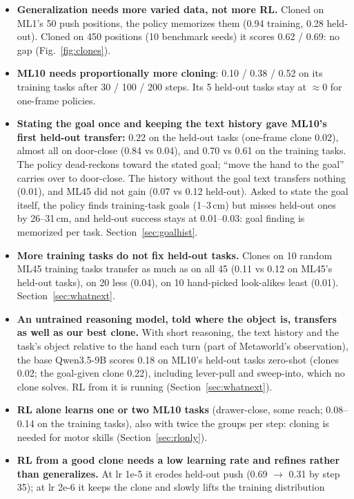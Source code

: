 \documentclass[11pt]{article}
\begin{document}
\begin{itemize}
\item \textbf{Generalization needs more varied data, not more RL.} Cloned on ML1's 50 push positions, the policy
  memorizes them (0.94 training, 0.28 held-out). Cloned on 450 positions (10 benchmark seeds) it scores 0.62 / 0.69: no gap
  (Fig.~\ref{fig:clones}).
\item \textbf{ML10 needs proportionally more cloning}: 0.10 / 0.38 / 0.52 on its training tasks after 30 / 100 / 200 steps.
  Its 5 held-out tasks stay at $\approx$0 for one-frame policies.
\item \textbf{Stating the goal once and keeping the text history gave ML10's first held-out transfer:} 0.22 on the
  held-out tasks (one-frame clone 0.02), almost all on door-close (0.84 vs 0.04), and 0.70 vs 0.61 on the training tasks.
  The policy dead-reckons toward the stated goal; ``move the hand to the goal'' carries over to door-close. The history
  without the goal text transfers nothing (0.01), and ML45 did not gain (0.07 vs 0.12 held-out). Asked to state the goal
  itself, the policy finds training-task goals (1--3\,cm) but misses held-out ones by 26--31\,cm, and held-out success
  stays at 0.01--0.03: goal finding is memorized per task. Section~\ref{sec:goalhist}.
\item \textbf{More training tasks do not fix held-out tasks.} Clones on 10 random ML45 training tasks transfer as much as on
  all 45 (0.11 vs 0.12 on ML45's held-out tasks), on 20 less (0.04), on 10 hand-picked look-alikes least (0.01).
  Section~\ref{sec:whatnext}.
\item \textbf{An untrained reasoning model, told where the object is, transfers as well as our best clone.} With short
  reasoning, the text history and the task's object relative to the hand each turn (part of Metaworld's observation),
  the base Qwen3.5-9B scores 0.18 on ML10's held-out tasks zero-shot (clones 0.02; the goal-given clone 0.22), including
  lever-pull and sweep-into, which no clone solves. RL from it is running (Section~\ref{sec:whatnext}).
\item \textbf{RL alone learns one or two ML10 tasks} (drawer-close, some reach; 0.08--0.14 on the training tasks), also
  with twice the groups per step: cloning is needed for motor skills (Section~\ref{sec:rlonly}).
\item \textbf{RL from a good clone needs a low learning rate and refines rather than generalizes.} At lr 1e-5 it erodes
  held-out push (0.69 $\to$ 0.31 by step 35); at lr 2e-6 it keeps the clone and slowly lifts the training distribution

\end{itemize}
\end{document}

